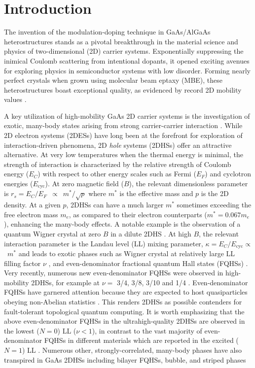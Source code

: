 \documentclass[reprint,amsmath,amssymb,aps,prl,nobibnotes,superscriptaddress]{revtex4-1}
\begin{document}
\section{Introduction}
The invention of the modulation-doping technique \cite{Dingle1978} in GaAs/AlGaAs heterostructures stands as a pivotal breakthrough in the material science and physics of two-dimensional (2D) carrier systems. Exponentially suppressing the inimical Coulomb scattering from intentional dopants, it opened exciting avenues for exploring physics in semiconductor systems with low disorder. Forming nearly perfect crystals when grown using molecular beam eptaxy (MBE), these heterostructures boast exceptional quality, as evidenced by record 2D mobility values \cite{Chung2021elec,Chung2022elec, Kulah2021, Manfra2014}. 

A key utilization of high-mobility GaAs 2D carrier systems is the investigation of exotic, many-body states arising from strong carrier-carrier interaction \cite{Shayegan2005, Halperin2020}. While 2D electron systems (2DESs) have long been at the forefront for exploration of interaction-driven phenomena, 2D \textit{hole} systems (2DHSs) offer an attractive alternative. At very low temperatures when the thermal energy is minimal, the strength of interaction is characterized by the relative strength of Coulomb energy ($E_C$) with respect to other energy scales such as Fermi ($E_F$) and cyclotron energies ($E_\textrm{cyc}$). At zero magnetic field ($B$), the relevant dimensionless parameter is $r_s = E_C/E_F$~$\propto$~$m^*/\sqrt{p}$  where $m^*$ is the effective mass and $p$ is the 2D density. At a given $p$, 2DHSs can have a much larger $m^*$ \cite{ Zhu2007, Watson2012} sometimes exceeding the free electron mass $m_e$, as compared to their electron counterparts ($m^*=0.067m_e$), enhancing the many-body effects. A notable example is the observation of a quantum Wigner crystal at zero $B$ in a dilute 2DHS \cite{Yoon1999}. At high $B$, the relevant interaction parameter is the Landau level (LL) mixing parameter, $\kappa=E_C/E_\textrm{cyc} \propto$~$m^*$ and leads to exotic phases such as Wigner crystal at relatively large LL filling factor $\nu$ \cite{Santos19921/3}, and even-denominator fractional quantum Hall states (FQHSs) \cite{Wang2022}. Very recently, numerous new even-denominator FQHSs were observed in high-mobility 2DHSs, for example at $\nu=$ 3/4, 3/8, 3/10 and 1/4 \cite{Wang2022, Wang2023A, Wang2023B}. Even-denominator FQHSs have garnered attention because they are expected to host quasiparticles obeying non-Abelian statistics \cite{Nayak2008}. This renders 2DHSs as possible contenders for fault-tolerant topological quantum computing. It is worth emphasizing that the above even-denominator FQHSs in the ultrahigh-quality 2DHSs are observed in the lowest ($N = 0$) LL ($\nu<1$), in contrast to the vast majority of even-denominator FQHSs in different materials which are reported in the excited ($N=1$) LL \cite{Nayak2008, Willett1987, Ki2014, Falson2015, Hossain2018, Shi2020, Dutta2022, KHuang2022}. Numerous other, strongly-correlated, many-body phases have also transpired in GaAs 2DHSs including bilayer FQHSs, bubble, and striped phases \cite{Manoharan1994signatures,Tutuc2004,Koduvayur2011,Kamburov2013,Liu2014,Liu2014even,Mueed2015,Liu2016,Jo2017,Ma2020,Ma2022,
}
\end{document}
